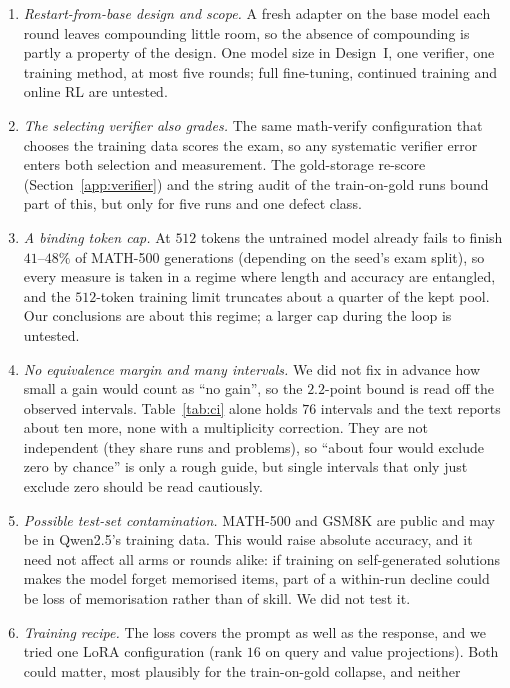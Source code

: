 \documentclass[runningheads]{llncs}
\begin{document}
\begin{enumerate}
golds become parseable once boxed), so the two corrections must not be added.
The re-scored false-negative share assumes the re-scored verifier makes no
false accepts.
\item \emph{Restart-from-base design and scope.} A fresh adapter on the base
model each round leaves compounding little room, so the absence of compounding
is partly a property of the design. One model size in Design~I, one verifier,
one training method, at most five rounds; full fine-tuning, continued training
and online RL are untested.
\item \emph{The selecting verifier also grades.} The same math-verify
configuration that chooses the training data scores the exam, so any systematic
verifier error enters both selection and measurement. The gold-storage re-score
(Section~\ref{app:verifier}) and the string audit of the train-on-gold runs
bound part of this, but only for five runs and one defect class.
\item \emph{A binding token cap.} At $512$ tokens the untrained model already
fails to finish $41$--$48\%$ of MATH-500 generations (depending on the seed's
exam split), so every measure is taken in a
regime where length and accuracy are entangled, and the $512$-token training
limit truncates about a quarter of the kept pool. Our conclusions are about this
regime; a larger cap during the loop is untested.
\item \emph{No equivalence margin and many intervals.} We did not fix in advance
how small a gain would count as ``no gain'', so the $2.2$-point bound is read off
the observed intervals. Table~\ref{tab:ci} alone holds $76$ intervals and the
text reports about ten more, none with a multiplicity correction. They are not
independent (they share runs and problems), so ``about four would exclude zero
by chance'' is only a rough guide, but single intervals that only just exclude
zero should be read cautiously.
\item \emph{Possible test-set contamination.} MATH-500 and GSM8K are public and
may be in Qwen2.5's training data. This would raise absolute accuracy, and it
need not affect all arms or rounds alike: if training on self-generated
solutions makes the model forget memorised items, part of a within-run decline
could be loss of memorisation rather than of skill. We did not test it.
\item \emph{Training recipe.} The loss covers the prompt as well as the response,
and we tried one LoRA configuration (rank $16$ on query and value projections).
Both could matter, most plausibly for the train-on-gold collapse, and neither

\end{enumerate}
\end{document}
